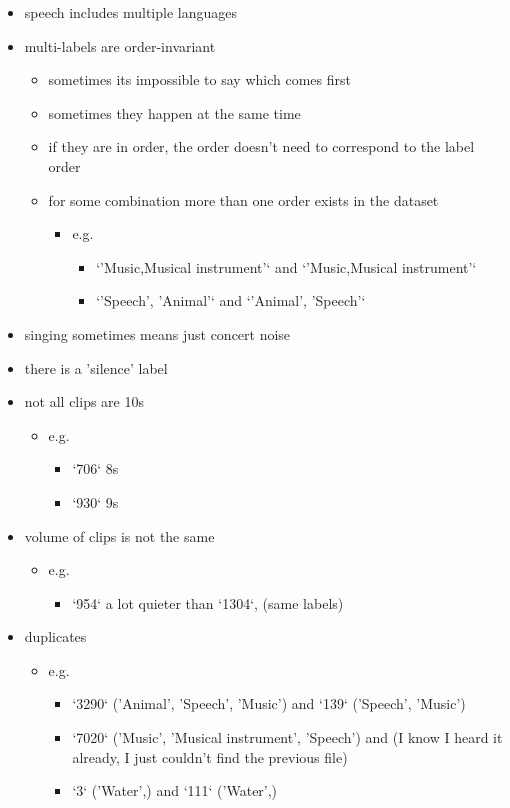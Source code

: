 \documentclass[11pt]{article}
\begin{document}
\begin{itemize}
  \item speech includes multiple languages
  \item multi-labels are order-invariant
  \begin{itemize}
    \item sometimes its impossible to say which comes first
    \item sometimes they happen at the same time
    \item if they are in order, the order doesn't need to correspond to the label order
    \item for some combination more than one order exists in the dataset
    \begin{itemize}
        \item e.g.
        \begin{itemize}
          \item `'Music,Musical instrument'` and `'Music,Musical instrument'`
          \item `'Speech', 'Animal'` and `'Animal', 'Speech'`
        \end{itemize}
    \end{itemize}
  \end{itemize}

  \item singing sometimes means just concert noise
  \item there is a 'silence' label
  \item not all clips are 10s
  \begin{itemize}
    \item e.g.
    \begin{itemize}
        \item `706` 8s
        \item `930` 9s
    \end{itemize}
  \end{itemize}

  \item volume of clips is not the same
  \begin{itemize}
    \item e.g.
    \begin{itemize}
        \item `954` a lot quieter than `1304`, (same labels)
    \end{itemize}
  \end{itemize}

  \item duplicates
  \begin{itemize}
    \item e.g.
    \begin{itemize}
        \item `3290` ('Animal', 'Speech', 'Music') and `139` ('Speech', 'Music')
        \item `7020` ('Music', 'Musical instrument', 'Speech') and (I know I heard it already, I just couldn't find the previous file)
        \item `3` ('Water',) and `111` ('Water',)
    \end{itemize}
  \end{itemize}


\end{itemize}
\end{document}
